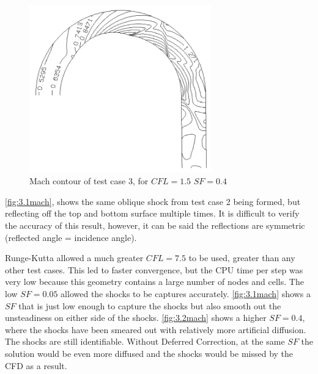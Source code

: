 \documentclass[12pt, a4paper]{article}
\begin{document}
\begin{figure}[H]
	\centering
	\includegraphics[width=0.7\textwidth]{plots/3.2 mach}
	\caption{Mach contour of test case 3, for $CFL=1.5$ $SF=0.4$}
	\label{fig:3.2mach}
\end{figure}
\autoref{fig:3.1mach}, shows the same oblique shock from test case 2 being formed, but reflecting off the top and bottom surface multiple times. It is difficult to verify the accuracy of this result, however, it can be said the reflections are symmetric (reflected angle = incidence angle). 

Runge-Kutta allowed a much greater $CFL=7.5$ to be used, greater than any other test cases. This led to faster convergence, but the CPU time per step was very low because this geometry contains a large number of nodes and cells. The low $SF=0.05$ allowed the shocks to be captures accurately. \autoref{fig:3.1mach} shows a $SF$ that is just low enough to capture the shocks but also smooth out the unsteadiness on either side of the shocks. \autoref{fig:3.2mach} shows a higher $SF=0.4$, where the shocks have been smeared out with relatively more artificial diffusion. The shocks are still identifiable. Without Deferred Correction, at the same $SF$ the solution would be even more diffused and the shocks would be missed by the CFD as a result.
\end{document}
